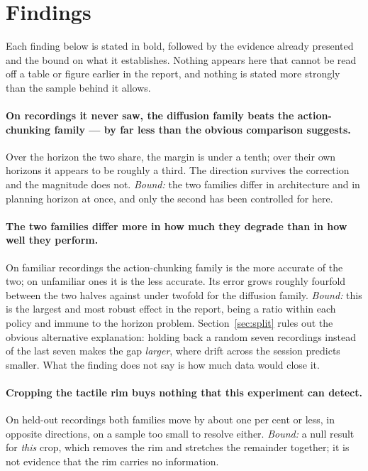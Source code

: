 \section{Findings}
\label{sec:findings}

Each finding below is stated in bold, followed by the evidence already
presented and the bound on what it establishes. Nothing appears here that
cannot be read off a table or figure earlier in the report, and nothing is
stated more strongly than the sample behind it allows.

\paragraph{\textbf{On recordings it never saw, the diffusion family beats the
action-chunking family --- by far less than the obvious comparison suggests.}}
Over the horizon the two share, the margin is under a tenth; over their own
horizons it appears to be roughly a third. The direction survives the
correction and the magnitude does not. \emph{Bound:} the two families differ in
architecture and in planning horizon at once, and only the second has been
controlled for here.

\paragraph{\textbf{The two families differ more in how much they degrade than
in how well they perform.}} On familiar recordings the action-chunking family
is the more accurate of the two; on unfamiliar ones it is the less accurate. Its
error grows roughly fourfold between the two halves against under twofold for
the diffusion family. \emph{Bound:} this is the largest and most robust effect
in the report, being a ratio within each policy and immune to the horizon
problem. Section~\ref{sec:split} rules out the obvious alternative explanation:
holding back a random seven recordings instead of the last seven makes the gap
\emph{larger}, where drift across the session predicts smaller. What the
finding does not say is how much data would close it.

\paragraph{\textbf{Cropping the tactile rim buys nothing that this experiment
can detect.}} On held-out recordings both families move by about one per cent
or less, in opposite directions, on a sample too small to resolve either.
\emph{Bound:} a null result for \emph{this} crop, which removes the rim and
stretches the remainder together; it is not evidence that the rim carries no
information.

